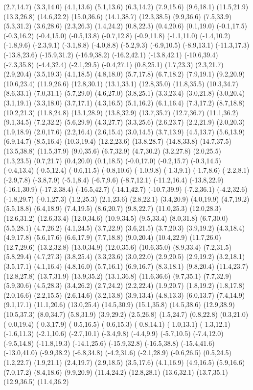 (2.7,14.7) (3.3,14.0) (4.1,13.6) (5.1,13.6) (6.3,14.2) (7.9,15.6) (9.6,18.1) (11.5,21.9) (13.3,26.8) (14.6,32.2) (15.0,36.6) (14.1,38.7) (12.3,38.5) (9.9,36.6) (7.5,33.9) (5.3,31.2) (3.6,28.6) (2.3,26.3) (1.4,24.2) (0.8,22.3) (0.4,20.6) (0.1,19.0) (-0.1,17.5) (-0.3,16.2) (-0.4,15.0) (-0.5,13.8) (-0.7,12.8) (-0.9,11.8) (-1.1,11.0) (-1.4,10.2) (-1.8,9.6) (-2.3,9.1) (-3.1,8.8) (-4.0,8.8) (-5.2,9.3) (-6.9,10.5) (-8.9,13.1) (-11.3,17.3) (-13.8,23.6) (-15.9,31.2) (-16.9,38.2) (-16.2,42.1) (-13.8,42.1) (-10.6,39.4) (-7.3,35.8) (-4.4,32.4) (-2.1,29.5) (-0.4,27.1) (0.8,25.1) (1.7,23.3) (2.3,21.7) (2.9,20.4) (3.5,19.3) (4.1,18.5) (4.8,18.0) (5.7,17.8) (6.7,18.2) (7.9,19.1) (9.2,20.9) (10.6,23.4) (11.9,26.6) (12.8,30.1) (13.1,33.1) (12.8,35.0) (11.8,35.5) (10.3,34.7) (8.6,33.1) (7.0,31.1) (5.7,29.0) (4.6,27.0) (3.8,25.1) (3.3,23.4) (3.0,21.8) (3.0,20.4) (3.1,19.1) (3.3,18.0) (3.7,17.1) (4.3,16.5) (5.1,16.2) (6.1,16.4) (7.3,17.2) (8.7,18.8) (10.2,21.3) (11.8,24.8) (13.1,28.9) (13.8,32.9) (13.7,35.7) (12.7,36.7) (11.1,36.2) (9.1,34.5) (7.2,32.2) (5.6,29.9) (4.3,27.7) (3.3,25.6) (2.6,23.7) (2.2,21.9) (2.0,20.3) (1.9,18.9) (2.0,17.6) (2.2,16.4) (2.6,15.4) (3.0,14.5) (3.7,13.9) (4.5,13.7) (5.6,13.9) (6.9,14.7) (8.5,16.4) (10.3,19.4) (12.2,23.6) (13.8,28.7) (14.8,33.8) (14.7,37.5) (13.5,38.8) (11.5,37.9) (9.0,35.6) (6.7,32.9) (4.7,30.2) (3.2,27.8) (2.0,25.5) (1.3,23.5) (0.7,21.7) (0.4,20.0) (0.1,18.5) (-0.0,17.0) (-0.2,15.7) (-0.3,14.5) (-0.4,13.4) (-0.5,12.4) (-0.6,11.5) (-0.8,10.6) (-1.0,9.8) (-1.3,9.1) (-1.7,8.6) (-2.2,8.1) (-2.9,7.8) (-3.8,7.9) (-5.1,8.4) (-6.7,9.6) (-8.7,12.1) (-11.2,16.4) (-13.8,22.9) (-16.1,30.9) (-17.2,38.4) (-16.5,42.7) (-14.1,42.7) (-10.7,39.9) (-7.2,36.1) (-4.2,32.6) (-1.8,29.7) (-0.1,27.3) (1.2,25.3) (2.1,23.6) (2.8,22.1) (3.4,20.9) (4.0,19.9) (4.7,19.2) (5.5,18.8) (6.4,18.9) (7.4,19.5) (8.6,20.7) (9.8,22.7) (11.0,25.3) (12.0,28.3) (12.6,31.2) (12.6,33.4) (12.0,34.6) (10.9,34.5) (9.5,33.4) (8.0,31.8) (6.7,30.0) (5.5,28.1) (4.7,26.2) (4.1,24.5) (3.7,22.9) (3.6,21.5) (3.7,20.3) (3.9,19.2) (4.3,18.4) (4.9,17.8) (5.6,17.6) (6.6,17.9) (7.7,18.8) (9.0,20.4) (10.4,22.9) (11.7,26.0) (12.7,29.6) (13.2,32.8) (13.0,34.9) (12.0,35.6) (10.6,35.0) (8.9,33.4) (7.2,31.5) (5.8,29.4) (4.7,27.3) (3.8,25.4) (3.3,23.6) (3.0,22.0) (2.9,20.5) (2.9,19.2) (3.2,18.1) (3.5,17.1) (4.1,16.4) (4.8,16.0) (5.7,16.1) (6.9,16.7) (8.3,18.1) (9.8,20.4) (11.4,23.7) (12.8,27.8) (13.7,31.9) (13.9,35.2) (13.1,36.8) (11.6,36.6) (9.7,35.1) (7.7,32.9) (5.9,30.6) (4.5,28.3) (3.4,26.2) (2.7,24.2) (2.2,22.4) (1.9,20.7) (1.8,19.2) (1.8,17.8) (2.0,16.6) (2.2,15.5) (2.6,14.6) (3.2,13.8) (3.9,13.4) (4.8,13.3) (6.0,13.7) (7.4,14.9) (9.1,17.1) (11.1,20.6) (13.0,25.4) (14.5,30.9) (15.1,35.8) (14.5,38.6) (12.9,38.9) (10.5,37.3) (8.0,34.7) (5.8,31.9) (3.9,29.2) (2.5,26.8) (1.5,24.7) (0.8,22.8) (0.3,21.0) (-0.0,19.4) (-0.3,17.9) (-0.5,16.5) (-0.6,15.3) (-0.8,14.1) (-1.0,13.1) (-1.3,12.1) (-1.6,11.3) (-2.1,10.6) (-2.7,10.1) (-3.4,9.8) (-4.4,9.9) (-5.7,10.5) (-7.4,12.0) (-9.5,14.8) (-11.8,19.3) (-14.1,25.6) (-15.9,32.8) (-16.5,38.8) (-15.4,41.6) (-13.0,41.0) (-9.9,38.2) (-6.8,34.8) (-4.2,31.6) (-2.1,28.9) (-0.6,26.5) (0.5,24.5) (1.2,22.7) (1.9,21.1) (2.4,19.7) (2.9,18.5) (3.5,17.6) (4.1,16.9) (4.9,16.5) (5.9,16.6) (7.0,17.2) (8.4,18.6) (9.9,20.9) (11.4,24.2) (12.8,28.1) (13.6,32.1) (13.7,35.1) (12.9,36.5) (11.4,36.2) 